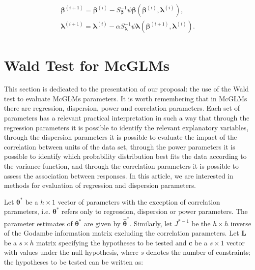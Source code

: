 \documentclass[Review,sagev,times, doublespace]{sagej}
\begin{document}
$$
\begin{aligned}
\begin{matrix}
\boldsymbol{\beta}^{(i+1)} = \boldsymbol{\beta}^{(i)}- S_{\boldsymbol{\beta}}^{-1} \psi \boldsymbol{\beta} (\boldsymbol{\beta}^{(i)}, \boldsymbol{\lambda}^{(i)}), \\ 
\boldsymbol{\lambda}^{(i+1)} = \boldsymbol{\lambda}^{(i)} - \alpha S_{\boldsymbol{\lambda}}^{-1} \psi \boldsymbol{\lambda} (\boldsymbol{\beta}^{(i+1)}, \boldsymbol{\lambda}^{(i)}).
\end{matrix}
\end{aligned}
$$


\section{Wald Test for McGLMs}\label{sec4}

This section is dedicated to the presentation of our proposal: the use of the Wald test to evaluate McGLMs parameters. It is worth remembering that in McGLMs there are regression, dispersion, power and correlation parameters. Each set of parameters has a relevant practical interpretation in such a way that through the regression parameters it is possible to identify the relevant explanatory variables, through the dispersion parameters it is possible to evaluate the impact of the correlation between units of the data set, through the power parameters it is possible to identify which probability distribution best fits the data according to the variance function, and through the correlation parameters it is possible to assess the association between responses. In this article, we are interested in methods for evaluation of regression and dispersion parameters.


Let $\boldsymbol{\theta^{*}}$ be a $h \times 1$ vector of parameters with the exception of correlation parameters, i.e. $\boldsymbol{\theta^{*}}$ refers only to regression, dispersion or power parameters. 
The parameter estimates of $\boldsymbol{\theta^{*}}$ are given by $\boldsymbol{\hat\theta^{*}}$. Similarly, let $J^{\boldsymbol{*}-1}$ be the $h \times h$ inverse of the Godambe information matrix excluding the correlation parameters. Let $\boldsymbol{L}$ be a $s \times h$ matrix specifying the hypotheses to be tested and $\boldsymbol{c}$ be a $s \times 1$ vector with values under the null hypothesis, where $s$ denotes the number of constraints; the hypotheses to be tested can be written as:
\end{document}
